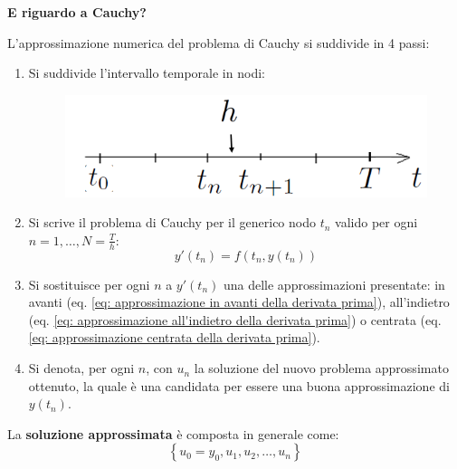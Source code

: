 \highspace
\begin{flushleft}
	\textcolor{Green3}{ \textbf{E riguardo a Cauchy?}}
\end{flushleft}
L'approssimazione numerica del problema di Cauchy si suddivide in 4 passi:
\begin{enumerate}
	\item Si suddivide l'intervallo temporale in nodi:
	\begin{figure}[!htp]
		\centering
		\includegraphics[width=.3\textwidth]{img/approssimazione-cauchy.png}
	\end{figure}
	
	\item Si scrive il problema di Cauchy per il generico nodo $t_{n}$ valido per ogni $n = 1, \dots, N = \frac{T}{h}$:
	\begin{equation*}
		y'\left(t_{n}\right) = f\left(t_{n}, y\left(t_{n}\right)\right)
	\end{equation*}
	
	\item Si sostituisce per ogni $n$ a $y'\left(t_{n}\right)$ una delle approssimazioni presentate: in avanti (eq. \ref{eq: approssimazione in avanti della derivata prima}), all'indietro (eq. \ref{eq: approssimazione all'indietro della derivata prima}) o centrata (eq. \ref{eq: approssimazione centrata della derivata prima}).
	
	\item Si denota, per ogni $n$, con $u_{n}$ la soluzione del nuovo problema approssimato ottenuto, la quale è una candidata per essere una buona approssimazione di $y\left(t_{n}\right)$.
\end{enumerate}
La \textbf{soluzione approssimata} è composta in generale come:
\begin{equation*}
	\left\{u_{0} = y_{0}, u_{1}, u_{2}, \dots, u_{n}\right\}
\end{equation*}